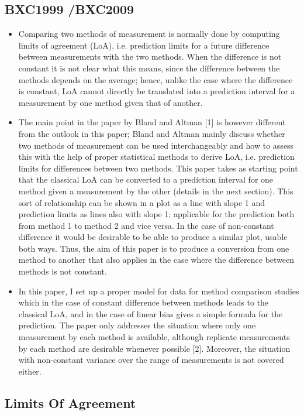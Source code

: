 \documentclass[Main.tex]{subfiles}
\begin{document}
\subsection{BXC1999 /BXC2009}
\begin{itemize}
	\item Comparing two methods of measurement is normally done by computing limits of agreement (LoA), i.e. prediction limits for
	a future difference between measurements with the two methods. When the difference is not constant it is not clear what
	this means, since the difference between the methods depends on the average; hence, unlike the case where the difference is
	constant, LoA cannot directly be translated into a prediction interval for a measurement by one method given that of another.
	\item The main point in the paper by Bland and Altman [1] is however different from the outlook in this paper; Bland and Altman
	mainly discuss whether two methods of measurement can be used interchangeably and how to assess this with the help of
	proper statistical methods to derive LoA, i.e. prediction limits for differences between two methods.
	This paper takes as starting point that the classical LoA can be converted to a prediction interval for one method given a
	measurement by the other (details in the next section). This sort of relationship can be shown in a plot as a line with slope 1
	and prediction limits as lines also with slope 1; applicable for the prediction both from method 1 to method 2 and vice versa. In
	the case of non-constant difference it would be desirable to be able to produce a similar plot, usable both ways. Thus, the aim
	of this paper is to produce a conversion from one method to another that also applies in the case where the difference between
	methods is not constant.
	\item In this paper, I set up a proper model for data for method comparison studies which in the case of constant difference between
	methods leads to the classical LoA, and in the case of linear bias gives a simple formula for the prediction. The paper only
	addresses the situation where only one measurement by each method is available, although replicate measurements by each
	method are desirable whenever possible [2]. Moreover, the situation with non-constant variance over the range of measurements
	is not covered either.
\end{itemize}
\subsection{Limits Of Agreement}

		
	

	
	
\end{document}
